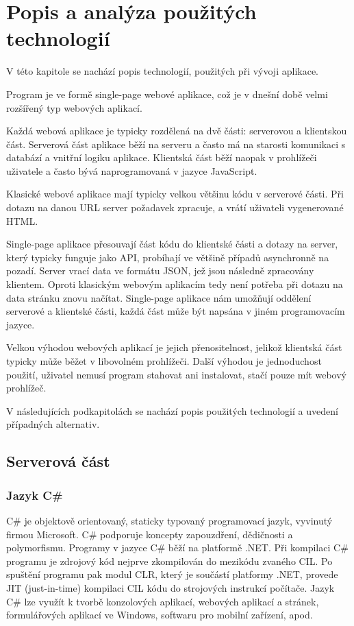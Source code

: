 
\chapter{Popis a analýza použitých technologií}

V této kapitole se nachází popis technologií, použitých při vývoji aplikace.

Program je ve formě single-page webové aplikace, což je v dnešní době velmi rozšířený typ webových aplikací.

Každá webová aplikace je typicky rozdělená na dvě části: serverovou a klientskou část. Serverová část aplikace běží na serveru a často má na starosti komunikaci s databází a vnitřní logiku aplikace. Klientská část běží naopak v prohlížeči uživatele a často bývá naprogramovaná v jazyce JavaScript. 

Klasické webové aplikace mají typicky velkou většinu kódu v serverové části. Při dotazu na danou URL server požadavek zpracuje, a vrátí uživateli vygenerované HTML.

Single-page aplikace přesouvají část kódu do klientské části a dotazy na server, který typicky funguje jako API, probíhají ve většině případů asynchronně na pozadí.
Server vrací data ve formátu JSON, jež jsou následně zpracovány klientem. Oproti klasickým webovým aplikacím tedy není potřeba při dotazu na data stránku znovu načítat.
Single-page aplikace nám umožňují oddělení serverové a klientské části, každá část může být napsána v jiném programovacím jazyce.

Velkou výhodou webových aplikací je jejich přenositelnost, jelikož klientská část typicky může běžet v libovolném prohlížeči.
Další výhodou je jednoduchost použití, uživatel nemusí program stahovat ani instalovat, stačí pouze mít webový prohlížeč.

V následujících podkapitolách se nachází popis použitých technologií a uvedení případných alternativ.

\section{Serverová část}

\subsection{Jazyk C\#}
C\# je objektově orientovaný, staticky typovaný programovací jazyk, vyvinutý firmou Microsoft.
C\# podporuje koncepty zapouzdření, dědičnosti a polymorfismu. Programy v jazyce C\# běží na platformě .NET. 
Při kompilaci C\# programu je zdrojový kód nejprve zkompilován do mezikódu zvaného CIL. 
Po spuštění programu pak modul CLR, který je součástí platformy .NET, provede JIT (just-in-time) kompilaci CIL kódu do strojových instrukcí počítače.
Jazyk C\# lze využít k tvorbě konzolových aplikací, webových aplikací a stránek, formulářových aplikací ve Windows, softwaru pro mobilní zařízení, apod. 
\cite{CSharpDocs}

